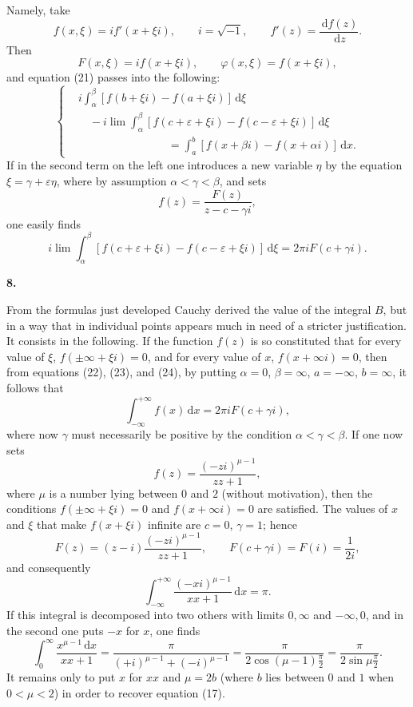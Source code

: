 \documentclass[11pt]{article}
\newcommand{\dd}{\,\mathrm d}
\newcommand{\art}[1]{\bigskip\begin{center}\large\bfseries #1.\end{center}\nopagebreak}
\begin{document}
Namely, take
\[
f(x,\xi)=i f'(x+\xi i), \qquad i=\sqrt{-1}, \qquad f'(z)=\frac{\dd f(z)}{\dd z}.
\]
Then
\[
F(x,\xi)=i f(x+\xi i),\qquad \varphi(x,\xi)=f(x+\xi i),
\]
and equation (21) passes into the following:
\begin{equation}
\left\{
\begin{aligned}
&i\int_\alpha^\beta [f(b+\xi i)-f(a+\xi i)]\dd\xi \\
&\quad -i\lim\int_\alpha^\beta [f(c+\varepsilon+\xi i)-f(c-\varepsilon+\xi i)]\dd\xi \\
&\hspace{8em}=\int_a^b [f(x+\beta i)-f(x+\alpha i)]\dd x .
\end{aligned}
\right.
\tag{22}
\end{equation}
If in the second term on the left one introduces a new variable $\eta$ by the equation $\xi=\gamma+\varepsilon\eta$, where by assumption $\alpha<\gamma<\beta$, and sets
\begin{equation}
f(z)=\frac{F(z)}{z-c-\gamma i},
\tag{23}
\end{equation}
one easily finds
\begin{equation}
i\lim\int_\alpha^\beta [f(c+\varepsilon+\xi i)-f(c-\varepsilon+\xi i)]\dd\xi=2\pi i F(c+\gamma i).
\tag{24}
\end{equation}

\art{8}

From the formulas just developed Cauchy derived the value of the integral $B$, but in a way that in individual points appears much in need of a stricter justification. It consists in the following. If the function $f(z)$ is so constituted that for every value of $\xi$, $f(\pm\infty+\xi i)=0$, and for every value of $x$, $f(x+\infty i)=0$, then from equations (22), (23), and (24), by putting $\alpha=0$, $\beta=\infty$, $a=-\infty$, $b=\infty$, it follows that
\begin{equation}
\int_{-\infty}^{+\infty} f(x)\dd x=2\pi i F(c+\gamma i),
\tag{25}
\end{equation}
where now $\gamma$ must necessarily be positive by the condition $\alpha<\gamma<\beta$. If one now sets
\[
f(z)=\frac{(-zi)^{\mu-1}}{zz+1},
\]
where $\mu$ is a number lying between $0$ and $2$ (without motivation), then the conditions $f(\pm\infty+\xi i)=0$ and $f(x+\infty i)=0$ are satisfied. The values of $x$ and $\xi$ that make $f(x+\xi i)$ infinite are $c=0$, $\gamma=1$; hence
\[
F(z)=(z-i)\frac{(-zi)^{\mu-1}}{zz+1},\qquad F(c+\gamma i)=F(i)=\frac1{2i},
\]
and consequently
\begin{equation}
\int_{-\infty}^{+\infty}\frac{(-xi)^{\mu-1}}{xx+1}\dd x=\pi.
\tag{26}
\end{equation}
If this integral is decomposed into two others with limits $0,\infty$ and $-\infty,0$, and in the second one puts $-x$ for $x$, one finds
\[
\int_0^\infty\frac{x^{\mu-1}\dd x}{xx+1}
=\frac{\pi}{(+i)^{\mu-1}+(-i)^{\mu-1}}
=\frac{\pi}{2\cos(\mu-1)\frac{\pi}{2}}
=\frac{\pi}{2\sin\mu\frac{\pi}{2}}.
\]
It remains only to put $x$ for $xx$ and $\mu=2b$ (where $b$ lies between $0$ and $1$ when $0<\mu<2$) in order to recover equation (17).
\end{document}
